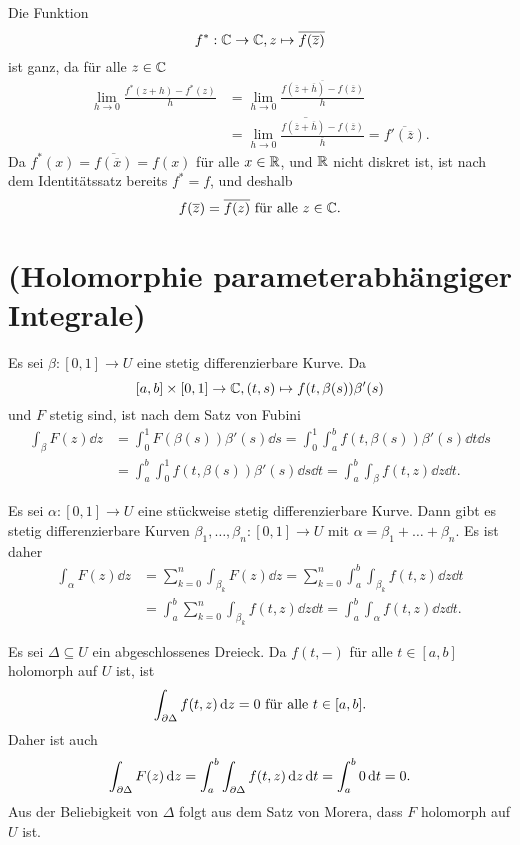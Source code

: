\documentclass[a4paper,10pt]{article}
\begin{document}
\subsection{}
Die Funktion
\[
 f^* : \mathbb{C} \to \mathbb{C}, z \mapsto \overline{f(\overline{z})}
\]
ist ganz, da für alle $z \in \mathbb{C}$
\begin{align*}
 \lim_{h \to 0} \frac{f^*(z+h)-f^*(z)}{h}
 &= \lim_{h \to 0} \frac{\overline{f(\overline{z}+\overline{h})-f(\overline{z})}}{h} \\
 &= \overline{ \lim_{h \to 0} \frac{f(\overline{z}+\overline{h})-f(\overline{z})}{\overline{h}} }
 = \overline{f'(\overline{z})}.
\end{align*}
Da $f^*(x) = \overline{f(\overline{x})} = f(x)$ für alle $x \in \mathbb{R}$, und $\mathbb{R}$ nicht diskret ist, ist nach dem Identitätssatz bereits $f^* = f$, und deshalb
\[
 f(\overline{z}) = \overline{f(z)} \text{ für alle } z \in \mathbb{C}.
\]


\section{(Holomorphie parameterabhängiger \\ Integrale)}

Es sei $\beta : [0,1] \to U$ eine stetig differenzierbare Kurve. Da
\[
 [a,b] \times [0,1] \to \mathbb{C}, (t,s) \mapsto f(t,\beta(s))\beta'(s)
\]
und $F$ stetig sind, ist nach dem Satz von Fubini
\begin{align*}
 \int_\beta F(z) \dd{z}
 &= \int_0^1 F(\beta(s)) \beta'(s) \dd{s}
 = \int_0^1 \int_a^b f(t,\beta(s)) \beta'(s) \dd{t} \dd{s} \\
 &= \int_a^b \int_0^1 f(t,\beta(s)) \beta'(s) \dd{s} \dd{t}
 = \int_a^b \int_\beta f(t,z) \dd{z} \dd{t}.
\end{align*}

Es sei $\alpha : [0,1] \to U$ eine stückweise stetig differenzierbare Kurve. Dann gibt es stetig differenzierbare Kurven $\beta_1, \ldots, \beta_n : [0,1] \to U$ mit $\alpha = \beta_1 + \ldots + \beta_n$. Es ist daher
\begin{align*}
 \int_\alpha F(z) \dd{z}
 &= \sum_{k=0}^n \int_{\beta_k} F(z) \dd{z}
 = \sum_{k=0}^n \int_a^b \int_{\beta_k} f(t,z) \dd{z} \dd{t} \\
 &= \int_a^b \sum_{k=0}^n \int_{\beta_k} f(t,z) \dd{z} \dd{t}
 = \int_a^b \int_\alpha f(t,z) \dd{z} \dd{t}.
\end{align*}

Es sei $\Delta \subseteq U$ ein abgeschlossenes Dreieck. Da $f(t,-)$ für alle $t \in [a,b]$ holomorph auf $U$ ist, ist
\[
 \int_{\partial \Delta} f(t,z) \,\text{d}z = 0 \text{ für alle } t \in [a,b].
\]
Daher ist auch
\[
 \int_{\partial \Delta} F(z) \,\text{d}z
 = \int_a^b \int_{\partial \Delta} f(t,z) \,\text{d}z \,\text{d}t
 = \int_a^b 0 \,\text{d}t
 = 0.
\]
Aus der Beliebigkeit von $\Delta$ folgt aus dem Satz von Morera, dass $F$ holomorph auf $U$ ist.
\end{document}
